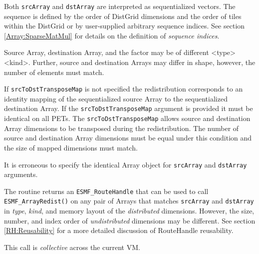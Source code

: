    Both {\tt srcArray} and {\tt dstArray} are interpreted as sequentialized 
   vectors. The sequence is defined by the order of DistGrid dimensions and the
   order of tiles within the DistGrid or by user-supplied arbitrary sequence
   indices. See section \ref{Array:SparseMatMul} for details on the definition
   of {\em sequence indices}.
  
   Source Array, destination Array, and the factor may be of different
   <type><kind>. Further, source and destination Arrays may differ in shape,
   however, the number of elements must match. 
    
   If {\tt srcToDstTransposeMap} is not specified the redistribution corresponds
   to an identity mapping of the sequentialized source Array to the
   sequentialized destination Array. If the {\tt srcToDstTransposeMap}
   argument is provided it must be identical on all PETs. The
   {\tt srcToDstTransposeMap} allows source and destination Array dimensions to
   be transposed during the redistribution. The number of source and destination
   Array dimensions must be equal under this condition and the size of mapped
   dimensions must match.
    
   It is erroneous to specify the identical Array object for {\tt srcArray} and
   {\tt dstArray} arguments. 
  
     The routine returns an {\tt ESMF\_RouteHandle} that can be used to call 
     {\tt ESMF\_ArrayRedist()} on any pair of Arrays that matches 
     {\tt srcArray} and {\tt dstArray} in {\em type}, {\em kind}, and 
     memory layout of the {\em distributed} dimensions. However, the size,
     number, and index order of {\em undistributed} dimensions may be different.
     See section \ref{RH:Reusability} for a more detailed discussion of
     RouteHandle reusability.
  
   This call is {\em collective} across the current VM.  
  
